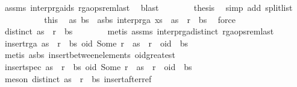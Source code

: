 \begin{isabellebody}
\ assms{\isacharparenleft}{}{\isacharparenright}\ interp{\isacharunderscore}rga{\isacharunderscore}ids\ rga{\isacharunderscore}ops{\isacharunderscore}rem{\isacharunderscore}last\ \isamarkupfalse%
\ blast\isanewline
\ \ \ \ \ \ \isamarkupfalse%
\ {\isacharquery}thesis\ \isamarkupfalse%
\ {\isacharparenleft}simp\ add{\isacharcolon}\ split{\isacharunderscore}list{\isacharparenright}\isanewline
\ \ \ \ \isamarkupfalse%
\isanewline
\ \ \ \ \isamarkupfalse%
\ this\ \isamarkupfalse%
\ as\ bs\ \ as{\isacharunderscore}bs{\isacharcolon}\ {\isachardoublequoteopen}interp{\isacharunderscore}rga\ xs\ {\isacharequal}\ as\ {\isacharat}\ r\ {\isacharhash}\ bs{\isachardoublequoteclose}\ \isamarkupfalse%
\ force\isanewline
\ \ \ \ \isamarkupfalse%
\ {\isachardoublequoteopen}distinct\ {\isacharparenleft}as\ {\isacharat}\ r\ {\isacharhash}\ bs{\isacharparenright}{\isachardoublequoteclose}\isanewline
\ \ \ \ \ \ \isamarkupfalse%
\ {\isacharparenleft}metis\ assms{\isacharparenleft}{}{\isacharparenright}\ interp{\isacharunderscore}rga{\isacharunderscore}distinct\ rga{\isacharunderscore}ops{\isacharunderscore}rem{\isacharunderscore}last{\isacharparenright}\isanewline
\ \ \ \ \isamarkupfalse%
\ {\isachardoublequoteopen}insert{\isacharunderscore}rga\ {\isacharparenleft}as\ {\isacharat}\ r\ {\isacharhash}\ bs{\isacharparenright}\ {\isacharparenleft}oid{\isacharcomma}\ Some\ r{\isacharparenright}\ {\isacharequal}\ as\ {\isacharat}\ r\ {\isacharhash}\ oid\ {\isacharhash}\ bs{\isachardoublequoteclose}\isanewline
\ \ \ \ \ \ \isamarkupfalse%
\ {\isacharparenleft}metis\ as{\isacharunderscore}bs\ insert{\isacharunderscore}between{\isacharunderscore}elements\ oid{\isacharunderscore}greatest{\isacharparenright}\isanewline
\ \ \ \ \isamarkupfalse%
\ \isamarkupfalse%
\ {\isachardoublequoteopen}insert{\isacharunderscore}spec\ {\isacharparenleft}as\ {\isacharat}\ r\ {\isacharhash}\ bs{\isacharparenright}\ {\isacharparenleft}oid{\isacharcomma}\ Some\ r{\isacharparenright}\ {\isacharequal}\ as\ {\isacharat}\ r\ {\isacharhash}\ oid\ {\isacharhash}\ bs{\isachardoublequoteclose}\isanewline
\ \ \ \ \ \ \isamarkupfalse%
\ {\isacharparenleft}meson\ {\isacartoucheopen}distinct\ {\isacharparenleft}as\ {\isacharat}\ r\ {\isacharhash}\ bs{\isacharparenright}{\isacartoucheclose}\ insert{\isacharunderscore}after{\isacharunderscore}ref{\isacharparenright}\isanewline

\end{isabellebody}
